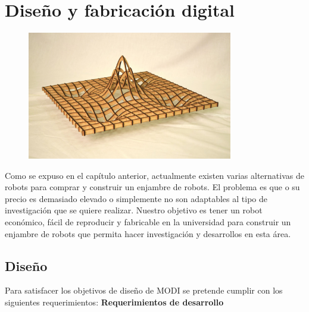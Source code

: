 \chapter{Diseño y fabricación digital} 

\label{Chapter4} 


\begin{figure}[htbp]
	\centering
		\includegraphics[width=0.8\textwidth]{./Figures/FabDig.JPG}
	\label{fig:FabDig}
\end{figure}

Como se expuso en el capítulo anterior, actualmente existen varias alternativas de robots para comprar y construir un enjambre de robots. El problema es que o su precio es demasiado elevado o simplemente no son adaptables al tipo de investigación que se quiere realizar. Nuestro objetivo es tener un robot económico, fácil de reproducir y fabricable en la universidad para construir un enjambre de robots que permita hacer investigación y desarrollos en esta área.


\section{Diseño}

Para satisfacer los objetivos de diseño de MODI se pretende cumplir con los siguientes requerimientos:
\newpage 
\textbf{Requerimientos de desarrollo}

